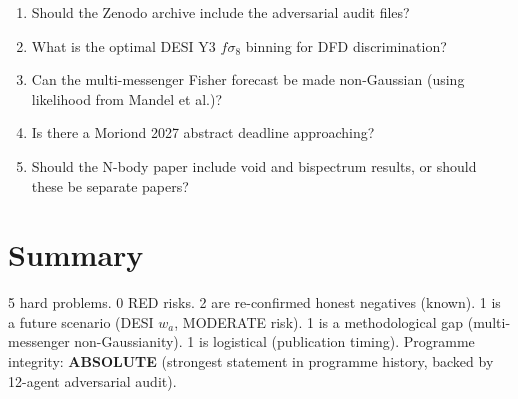 \documentclass[11pt,a4paper]{article}
\begin{document}
\begin{enumerate}[nosep]
\item Should the Zenodo archive include the adversarial audit files?
\item What is the optimal DESI Y3 $f\sigma_8$ binning for DFD discrimination?
\item Can the multi-messenger Fisher forecast be made non-Gaussian (using likelihood from Mandel et al.)?
\item Is there a Moriond 2027 abstract deadline approaching?
\item Should the N-body paper include void and bispectrum results, or should these be separate papers?
\end{enumerate}

\section{Summary}

5 hard problems. 0 RED risks. 2 are re-confirmed honest negatives (known). 1 is a future scenario (DESI $w_a$, MODERATE risk). 1 is a methodological gap (multi-messenger non-Gaussianity). 1 is logistical (publication timing). Programme integrity: \textbf{ABSOLUTE} (strongest statement in programme history, backed by 12-agent adversarial audit).
\end{document}
